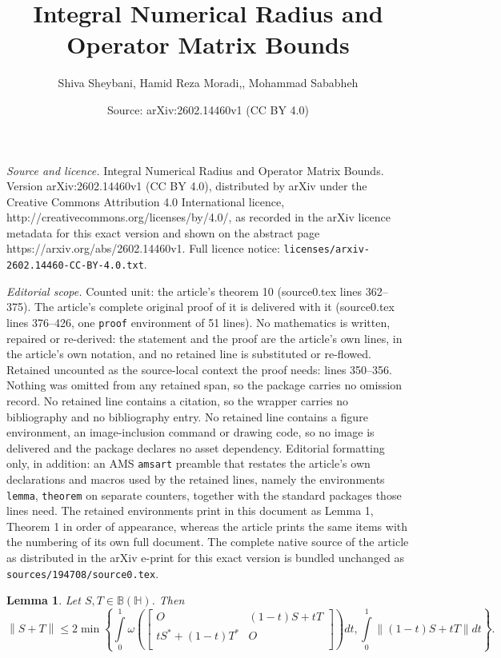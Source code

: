 \documentclass[10pt,a4paper]{amsart}
\title{Integral Numerical Radius and Operator Matrix Bounds}
\author{Shiva Sheybani, Hamid Reza Moradi,, Mohammad Sababheh}
\date{Source: arXiv:2602.14460v1 (CC BY 4.0)}
\newtheorem{lemma}{Lemma}
\begin{document}
\maketitle

\noindent\emph{Source and licence.} Integral Numerical Radius and Operator Matrix Bounds. Version arXiv:2602.14460v1 (CC BY 4.0), distributed by arXiv under the Creative Commons Attribution 4.0 International licence, http://creativecommons.org/licenses/by/4.0/, as recorded in the arXiv licence metadata for this exact version and shown on the abstract page https://arxiv.org/abs/2602.14460v1. Full licence notice: \texttt{licenses/arxiv-2602.14460-CC-BY-4.0.txt}.\par\smallskip

\noindent\textit{Editorial scope.} Counted unit: the article's theorem 10 (source0.tex lines 362--375). The article's complete original proof of it is delivered with it (source0.tex lines 376--426, one \texttt{proof} environment of 51 lines). No mathematics is written, repaired or re-derived: the statement and the proof are the article's own lines, in the article's own notation, and no retained line is substituted or re-flowed.  Retained uncounted as the source-local context the proof needs: lines 350--356.  Nothing was omitted from any retained span, so the package carries no omission record.  No retained line contains a citation, so the wrapper carries no bibliography and no bibliography entry.  No retained line contains a figure environment, an image-inclusion command or drawing code, so no image is delivered and the package declares no asset dependency.  Editorial formatting only, in addition: an AMS \texttt{amsart} preamble that restates the article's own declarations and macros used by the retained lines, namely the environments \texttt{lemma}, \texttt{theorem} on separate counters, together with the standard packages those lines need.  The retained environments print in this document as Lemma 1, Theorem 1 in order of appearance, whereas the article prints the same items with the numbering of its own full document.  The complete native source of the article as distributed in the arXiv e-print for this exact version is bundled unchanged as \texttt{sources/194708/source0.tex}.
\begin{lemma}\label{5}
Let $S,T\in \mathbb B\left( \mathbb H \right)$. Then
\[\left\| S+T \right\|\le 2\min \left\{ \int\limits_{0}^{1}{\omega \left( \left[ \begin{matrix}
   O & \left( 1-t \right)S+tT  \\
   t{{S}^{*}}+\left( 1-t \right){{T}^{*}} & O  \\
\end{matrix} \right] \right)dt},\int\limits_{0}^{1}{\left\| \left( 1-t \right)S+tT \right\|dt} \right\}.\]
\end{lemma}
\end{document}
